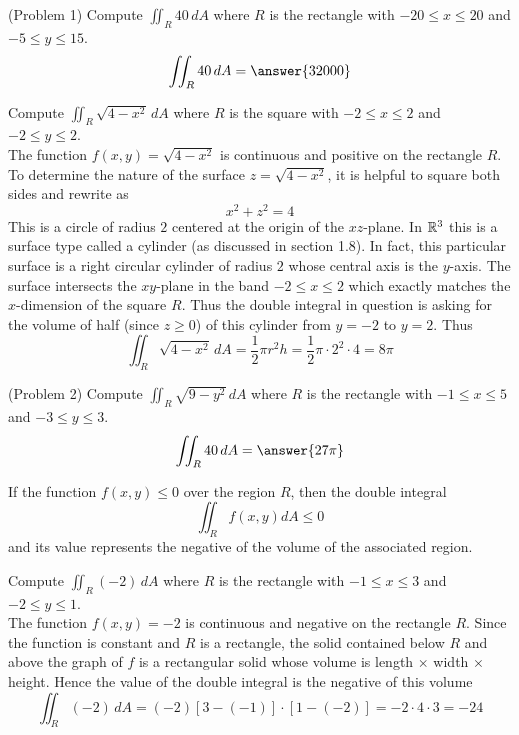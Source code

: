 \documentclass[handout]{ximera}
\begin{document}
\begin{problem}(Problem 1)
Compute $\iint_R 40 \, dA$ where $R$ is the rectangle with $-20 \leq x \leq 20$ and $-5 \leq y \leq 15$.\\
\[
\iint_R 40 \, dA = \answer{32000}
\]
\end{problem}

\begin{example}[Example 2]
Compute $\iint_R \sqrt{4 - x^2} \, dA$ where $R$ is the square with $-2 \leq x \leq 2$ and $-2 \leq y \leq 2$.\\
The function $f(x,y) = \sqrt{4-x^2}$ is continuous and positive on the rectangle $R$.  To determine the nature of the 
surface $z = \sqrt{4-x^2}$, it is helpful to square both sides and rewrite as
\[
x^2 + z^2 = 4
\]
This is a circle of radius $2$ centered at the origin of the $xz$-plane.  In $\mathbb R^3$ this is a surface type called a cylinder (as discussed in section 1.8).
In fact, this particular surface is a right circular cylinder of radius $2$ whose central axis is the $y$-axis. The surface intersects the $xy$-plane in the 
band $-2 \leq x \leq 2$ which exactly matches the $x$-dimension of the square $R$.
Thus the double integral in question is asking for the volume of half (since $z \geq 0$) of this cylinder from $y = -2$ to $ y = 2$. Thus
\[
\iint_R \sqrt{4 - x^2} \, dA = \frac12 \pi r^2 h = \frac12 \pi \cdot 2^2 \cdot 4 = 8\pi
\]
\end{example}


\begin{problem}(Problem 2)
Compute $\iint_R \sqrt{9 - y^2} \, dA$ where $R$ is the rectangle with $-1 \leq x \leq 5$ and $-3 \leq y \leq 3$.\\
\[
\iint_R 40 \, dA = \answer{27\pi}
\]
\end{problem}

\begin{remark} If the function $f(x,y) \leq 0$ over the region $R$, then the double integral
\[
\iint_{R} f(x,y) dA \leq 0
\]
and its value represents the negative of the volume of the associated region.
\end{remark}

\begin{example}[Example 3]
Compute $\iint_R (-2) \, dA$ where $R$ is the rectangle with $-1 \leq x \leq 3$ and $-2 \leq y \leq 1$.\\
The function $f(x,y) = -2$ is continuous and negative on the rectangle $R$.  Since the function is constant and $R$ is a rectangle, the solid contained below $R$
and above the graph of $f$ is a rectangular solid whose volume is length $\times$ width $\times$ height.
Hence the value of the double integral is the negative of this volume
\[
\iint_R (-2) \, dA = (-2)[3-(-1)] \cdot [1-(-2)] = -2 \cdot 4 \cdot 3 = -24
\]
\end{example}
\end{document}

